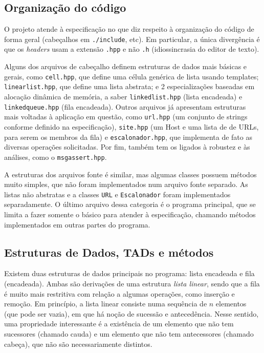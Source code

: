 \documentclass{article}
\def\code#1{\texttt{#1}}
\begin{document}
\subsection{Organização do código}

O projeto atende à especificação no que diz respeito à organização do código de forma geral (cabeçalhos em \code{./include}, etc). Em particular, a única divergência é que os \emph{headers} usam a extensão \code{.hpp} e não \code{.h} (idiossincrasia do editor de texto).

Alguns dos arquivos de cabeçalho definem estruturas de dados mais básicas e gerais, como \code{cell.hpp}, que define uma célula genérica de lista usando templates; \code{linearlist.hpp}, que define uma lista abstrata; e 2 especializações baseadas em alocação dinâmica de memória, a saber \code{linkedlist.hpp} (lista encadeada) e \code{linkedqueue.hpp} (fila encadeada). Outros arquivos já apresentam estruturas mais voltadas à aplicação em questão, como \code{url.hpp} (um conjunto de strings conforme definido na especificação), \code{site.hpp} (um Host e uma lista de de URLs, para serem os membros da fila) e \code{escalonador.hpp}, que implementa de fato as diversas operações solicitadas. Por fim, também tem os ligados à robustez e às análises, como o \code{msgassert.hpp}.

A estruturas dos arquivos fonte é similar, mas algumas classes possuem métodos muito simples, que não foram implementados num arquivo fonte separado. As listas não abstratas e a classes \code{URL}  e \code{Escalonador} foram implementados separadamente. O último arquivo dessa categoria é o programa principal, que se limita a fazer somente o básico para atender à especificação, chamando métodos implementados em outras partes do programa.

\subsection{Estruturas de Dados, TADs e métodos}

Existem duas estruturas de dados principais no programa: lista encadeada e fila (encadeada). Ambas são derivações de uma estrutura \textit{lista linear}, sendo que a fila é muito mais restritiva com relação a algumas operações, como inserção e remoção. Em princípio, a lista linear consiste numa sequência de \( n \) elementos (que pode ser vazia), em que há noção de sucessão e antecedência. Nesse sentido, uma propriedade interessante é a existência de um elemento que não tem sucessores (chamado cauda) e um elemento que não tem antecessores (chamado cabeça), que não são necessariamente distintos.
\end{document}
